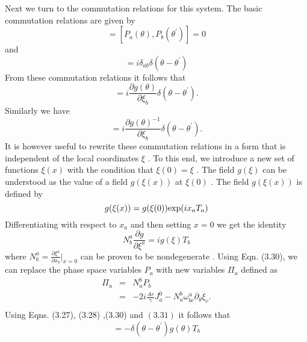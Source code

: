 \documentclass[a4paper,12pt]{article}
\begin{document}
Next we turn to the commutation relations for this system.
The basic commutation relations  are given by
\begin{equation}
[{\xi}_a(\theta),{\xi}_b({\theta}^{'})]=[P_a({\theta}),P_b({\theta}^{'})]=0 
\end{equation}
and
\begin{equation}
[{\xi}_a(\theta),P_b({\theta}^{'})]=
i{\delta}_{ab}{\delta}(\theta - {\theta}^{'})
\end{equation}
From these commutation relations it follows that
\begin{equation}
[g(\theta),P_b({\theta}^{'})]=i\frac{{\partial}{g(\theta)}}{{\partial} 
{\xi}_b}{\delta}({\theta} - {\theta}^{'}).
\end{equation}
Similarly we have
\begin{equation}
[g(\theta)^{-1},P_b({\theta}^{'})]=i\frac{{\partial}{g(\theta)^{-1}}}
{{\partial}{\xi}_b}{\delta}({\theta} - {\theta}^{'}).
\end{equation} 
It is however useful to rewrite 
these commutation relations in a  form that is independent of the local
coordinates $\xi$ \cite{bal}.
 To this end,
we  introduce a new set of functions 
${\xi}(x)$ with the condition that
$ {\xi}(0)={\xi} $ . The field $ g({\xi})$ can
 be understood as the value of a field $ g({\xi}(x)) $ at $ {\xi}(0)$ . The
 field $ g({\xi}(x)) $ is defined by
\begin{equation}
g({\xi}(x))=g({\xi}(0)) {\rm exp} (ix_a T_a)
\end{equation}
Differentiating with respect to $ x_a $ and then setting $ x=0 $
 we get the  identity
\begin{equation}
N^{a}_{b} \frac{{\partial}g}{{\partial}{\xi}^a} = i g({\xi}) T_b
\end{equation}
where $ N^{a}_{b} =\frac{{\partial}{\xi}^a}{{\partial}x_b}{|}_{x=0} $
can be proven to be nondegenerate \cite{bal}. Using Eqn. (3.30),
we can replace the phase space 
variables $ P_a $ with new variables
$ {\Pi}_a $ defined as    
\begin{eqnarray}
{\Pi}_a&=&N^{b}_{a}P_{b}\nonumber\\
&=&-2i\frac{Ar}{\gamma} J^{0}_{a} -N_{a}^{b}
{\omega}^{u}_{bc}{\partial}_{\theta}{\xi}_c.\nonumber\\
\end{eqnarray}
Using Eqns. (3.27), (3.28) ,(3.30) and $(3.31)$ it  follows that
\begin{equation}
[g(\theta),{\Pi}_b({\theta}^{'})]=-{\delta}({\theta} - {\theta}^{'})g(\theta)
T_b
\end{equation}
\end{document}
